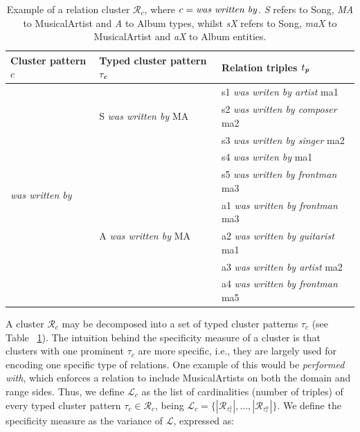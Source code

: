 \begin{table}[]
\scriptsize
	\begin{tabular}{ | l | l | l | }
	\hline
\textbf{Cluster pattern $c$} & \textbf{Typed cluster pattern $ \tau_\textbf{\textit{c}}$} & \textbf{Relation triples $t_\textbf{\textit{p}}$} \\
\hline
\multirow{10}{*}{\textit{was written by}} & \multirow{3}{*}{S \textit{was written by} MA} & s1 \textit{was writen by artist} ma1 \\
\cline{3-3}
 &  & s2 \textit{was written by composer} ma2 \\
\cline{3-3}
 &  & s3 \textit{was written by singer} ma2 \\
\cline{3-3}
&  & s4 \textit{was writen by} ma1 \\
 \cline{3-3}
&  & s5 \textit{was written by frontman} ma3 \\
\cline{2-3}
& \multirow{3}{*}{A \textit{was written by} MA} & a1 \textit{was written by frontman} ma3 \\
 \cline{3-3}
&  & a2 \textit{was written by guitarist} ma1 \\
\cline{3-3}
&  & a3 \textit{was written by artist} ma2 \\
\cline{3-3}
&  & a4 \textit{was written by frontman} ma5 \\
    \hline
	\end{tabular}
	\caption[Example of a relation cluster.]{Example of a relation cluster $\mathcal{R}_c$, where $c = \mbox{\textit{was written by}}$. \textit{S} refers to Song, \textit{MA} to MusicalArtist and \textit{A} to Album types, whilst \textit{sX} refers to Song, \textit{maX} to MusicalArtist and \textit{aX} to Album entities.}
	\label{tbl:kb:example_grouping}
\end{table}

A cluster $\mathcal{R}_c$ may be decomposed into a set of typed cluster patterns $\tau_c$ (see Table ~\ref{tbl:kb:example_grouping}). The intuition behind the specificity measure of a cluster is that clusters with one prominent $\tau_c$ are more specific, i.e., they are largely used for encoding one specific type of relations. One example of this would be \textit{performed with}, which enforces a relation to include MusicalArtists on both the domain and range sides. Thus, we define $\mathcal{L}_c$ as the list of cardinalities (number of triples) of every typed cluster pattern $\tau_c \in \mathcal{R}_c$, being $\mathcal{L}_c = \{|\mathcal{R}_{\tau_c^1}|,...,|\mathcal{R}_{\tau_c^n}|\}$. We define the specificity measure as the variance of $\mathcal{L}$, expressed as:


